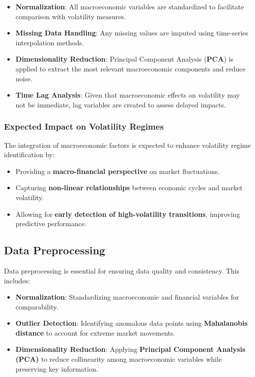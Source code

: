 \begin{itemize}

    \item \textbf{Normalization}: All macroeconomic variables are standardized to facilitate comparison with volatility measures.
    \item \textbf{Missing Data Handling}: Any missing values are imputed using time-series interpolation methods.
    \item \textbf{Dimensionality Reduction}: Principal Component Analysis (\textbf{PCA}) is applied to extract the most relevant macroeconomic components and reduce noise.
    \item \textbf{Time Lag Analysis}: Given that macroeconomic effects on volatility may not be immediate, lag variables are created to assess delayed impacts.

\end{itemize}

\subsubsection{Expected Impact on Volatility Regimes}
The integration of macroeconomic factors is expected to enhance volatility regime identification by:

\begin{itemize}

    \item Providing a \textbf{macro-financial perspective} on market fluctuations.
    \item Capturing \textbf{non-linear relationships} between economic cycles and market volatility.
    \item Allowing for \textbf{early detection of high-volatility transitions}, improving predictive performance.

\end{itemize}

\subsection{Data Preprocessing}

Data preprocessing is essential for ensuring data quality and consistency. This includes:

\begin{itemize}

    \item \textbf{Normalization}: Standardizing macroeconomic and financial variables for comparability.
    \item \textbf{Outlier Detection}: Identifying anomalous data points using \textbf{Mahalanobis distance} to account for extreme market movements.
    \item \textbf{Dimensionality Reduction}: Applying \textbf{Principal Component Analysis (PCA)} to reduce collinearity among macroeconomic variables while preserving key information.
    
\end{itemize}

